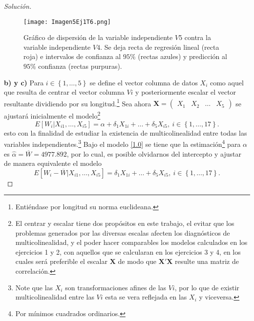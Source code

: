 \documentclass[10.5pt,notitlepage]{article}
\newenvironment{solucion}
  {\begin{proof}[Solución]}
  {\end{proof}}
\newcommand{\kis}[1]{\left\{ #1 \right\}}
\theoremstyle{plain}
\begin{document}
\begin{solucion}
\begin{figure}[htb]
\label{fig:4}
\end{figure}
\begin{figure}[htb]
 \centering
 \texttt{[image: Imagen5Ej1T6.png]}
 \caption{Gráfico de dispersión de la variable independiente \(V5\) contra la variable independiente \(V4\). Se deja recta de regresión lineal (recta roja) e intervalos de confianza al \(95\%\) (rectas azules) y predicción al \(95\%\) confianza (rectas purpuras).}
\label{fig:5}
\end{figure}

\noindent \textbf{b) y c)} Para \(i \in \kis{1,\hdots,5}\) se define el vector columna de datos \(X_i\) como aquel que resulta de centrar el vector columna \(Vi\) y posteriormente escalar el vector resultante dividiendo por su longitud.\footnote{Entiéndase por longitud su norma euclideana.} Sea ahora \(\mathbf{X} = \begin{pmatrix}  X_1 & X_2 & \hdots & X_5\end{pmatrix}\) se ajustará inicialmente el modelo\footnote{El centrar y escalar tiene dos propósitos en este trabajo, el evitar que los problemas generados por las diversas escalas afecten los diagnósticos de multicolinealidad, y el poder hacer comparables los modelos calculados en los ejercicios 1 y 2, con aquellos que se calcularan en los ejercicios 3 y 4, en los cuales será preferible el escalar \(\mathbf{X}\) de modo que \(\mathbf{X}'\mathbf{X}\) resulte una matriz de correlación.} 
\begin{equation}\label{1.0}
    E[W_{i}| X_{i1}, \hdots, X_{i5}] = \alpha + \delta_{1} X_{1i} + \hdots + \delta_{5} X_{i5}, \ i \in \kis{1, \hdots, 17}.
\end{equation}
esto con la finalidad de estudiar la existencia de multicolinealidad entre todas las variables independientes.\footnote{Note que las \(X_i\) son transformaciones afines de las \(Vi\), por lo que de existir multicolinealidad entre las \(Vi\) esta se vera reflejada en las \(X_i\) y viceversa.} Bajo el modelo \eqref{1.0} se tiene que la estimación\footnote{Por mínimos cuadrados ordinarios.} para \(\alpha\) es \(\hat{\alpha} = \overline{W} = 4977.892\), por lo cual, es posible olvidarnos del intercepto y ajustar de manera equivalente el modelo
\begin{equation}\label{1.2}
    E[W_{i} - \overline{W}| X_{i1}, \hdots, X_{i5}] =  \delta_{1} X_{1i} + \hdots+ \delta_{5} X_{i5}, \ i \in \kis{1, \hdots, 17}.
\end{equation}

\end{solucion}
\end{document}
